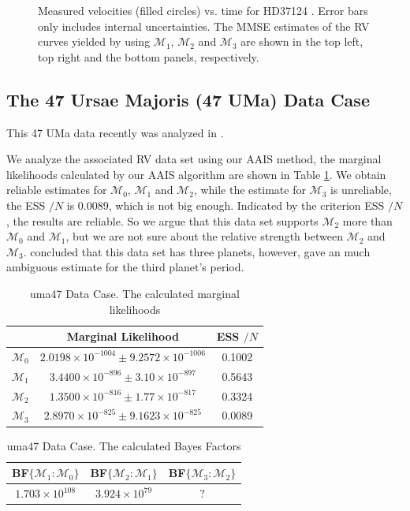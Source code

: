 \documentclass[aoas]{imsart}
\def\ESS{\textsf{ESS }}
\def\BF{\textsf{BF}}
\begin{document}
\begin{figure}[!htb]
\begin{tabular}{c}
\end{tabular}
\caption{Measured velocities (filled circles) vs. time for HD37124
\cite{tinney20062}. Error bars only includes internal uncertainties.
The MMSE estimates of the RV curves yielded by using
$\mathcal{M}_1$, $\mathcal{M}_2$ and $\mathcal{M}_3$ are shown in
the top left, top right and the bottom panels, respectively.}
\label{fig:hd37124_fit}
\end{figure}

\subsection{The 47 Ursae Majoris (47 UMa) Data Case}
This 47 UMa data recently was analyzed in
\cite{gregory2010bayesian}.

We analyze the associated RV data set using our AAIS method, the
marginal likelihoods calculated by our AAIS algorithm are shown in
Table \ref{marginal_likelihood_uma47}. We obtain reliable estimates
for $\mathcal{M}_0$, $\mathcal{M}_1$ and $\mathcal{M}_2$, while the
estimate for $\mathcal{M}_3$ is unreliable, the \ESS$/N$ is 0.0089,
which is not big enough. Indicated by the criterion \ESS$/N$, the
results are reliable. So we argue that this data set supports
$\mathcal{M}_2$ more than $\mathcal{M}_0$ and $\mathcal{M}_1$, but
we are not sure about the relative strength between $\mathcal{M}_2$
and $\mathcal{M}_3$. \cite{gregory2010bayesian} concluded that this
data set has three planets, however, gave an much ambiguous estimate
for the third planet's period.

\begin{table}
\begin{tabular}{c|c|c}
 & Marginal Likelihood & \ESS$/N$\\
\hline $\mathcal{M}_0$ & $2.0198\times10^{-1004}\pm9.2572\times10^{-1006}$ & 0.1002\\
\hline $\mathcal{M}_1$ & $3.4400\times10^{-896}\pm3.10\times10^{-897}$ & 0.5643\\
\hline $\mathcal{M}_2$ & $1.3500\times10^{-816}\pm1.77\times10^{-817}$ & 0.3324 \\
\hline $\mathcal{M}_3$ & $2.8970\times10^{-825}\pm9.1623\times10^{-825}$ & 0.0089 \\
\hline
\end{tabular}
\caption{uma47 \citep{gregory2010bayesian} Data Case. The
calculated marginal likelihoods}\label{marginal_likelihood_uma47}
\end{table}

\begin{table}
\begin{tabular}{c|c|c}
 \BF$\{\mathcal{M}_1:\mathcal{M}_0\}$ & \BF$\{\mathcal{M}_2:\mathcal{M}_1\}$ & \BF$\{\mathcal{M}_3:\mathcal{M}_2\}$\\
\hline $1.703\times10^{108}$ & $3.924\times10^{79}$ & $ ?$\\
\hline
\end{tabular}
\caption{uma47 \citep{gregory2010bayesian} Data Case. The
calculated Bayes Factors}\label{Bayes_factor_uma47}
\end{table}
\end{document}
